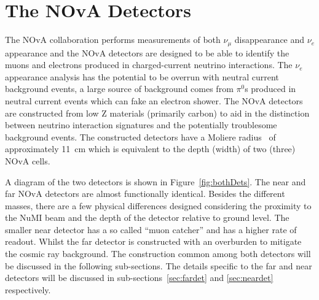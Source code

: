 \section{The NOvA Detectors}




The NOvA collaboration performs measurements of both $\nu_{\mu}$
disappearance and $\nu_e$ appearance and the NOvA detectors are
designed to be able to identify the muons and electrons produced in
charged-current neutrino interactions. 
The $\nu_e$ appearance
analysis has the potential to be overrun with neutral current
background events, 
a large source of background comes from $\pi^0$s produced in
neutral current 
events which can fake an electron shower.
The NOvA detectors are constructed from low Z materials (primarily
carbon) to aid in the distinction between neutrino interaction
signatures and the potentially troublesome background events.
The constructed detectors have a Moliere radius~\cite{pdg} of
approximately 11~cm which is equivalent to the depth (width) of two
(three) NOvA cells.  

A diagram of the two detectors
is shown in Figure~\ref{fig:bothDets}. 
The near and far NOvA detectors are almost functionally
identical. Besides
the different masses, there are a few physical
differences designed considering the proximity to the NuMI beam and
the depth of the detector relative to ground level. 
The smaller near detector has a so called ``muon catcher'' and
has a higher rate of readout. 
Whilst the far detector is constructed with an overburden to mitigate
the cosmic ray background.
The
construction common among both detectors will be discussed in the
following sub-sections. The details specific to the far and near detectors
will be discussed in sub-sections~\ref{sec:fardet} and
\ref{sec:neardet} respectively.

